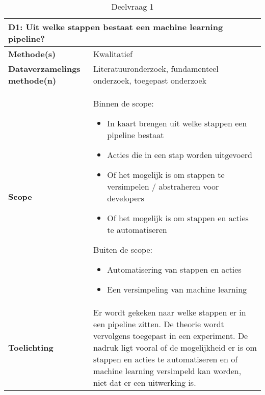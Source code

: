 \begin{table}[hbt!]
\centering
\begin{tabular}{|p{.215\linewidth}|p{.72\linewidth}|}
\hline
\multicolumn{2}{|p{.97\linewidth}|}{\textbf{D1: Uit welke stappen bestaat een machine learning pipeline?}} \\ \hline
  \textbf{Methode(s)}&
    Kwalitatief
  \\ \hline
  \textbf{Dataverzamelings methode(n)}&
    Literatuuronderzoek, fundamenteel onderzoek, toegepast onderzoek
  \\ \hline
  \textbf{Scope}&
    Binnen de scope:
    \begin{itemize}
      \item In kaart brengen uit welke stappen een pipeline bestaat
      \item Acties die in een stap worden uitgevoerd
      \item Of het mogelijk is om stappen te versimpelen / abstraheren voor developers
      \item Of het mogelijk is om stappen en acties te automatiseren
    \end{itemize}
    Buiten de scope:
    \begin{itemize}
      \item Automatisering van stappen en acties
      \item Een versimpeling van machine learning
    \end{itemize}
  \\ \hline
  \textbf{Toelichting}&
    Er wordt gekeken naar welke stappen er in een pipeline zitten. De theorie wordt vervolgens toegepast in een experiment. De nadruk ligt vooral of de mogelijkheid er is om stappen en acties te automatiseren en of machine learning versimpeld kan worden, niet dat er een uitwerking is.
  \\ \hline
\end{tabular}
\caption{Deelvraag 1}
\label{table:sq1}
\end{table}

\space
\newpage

